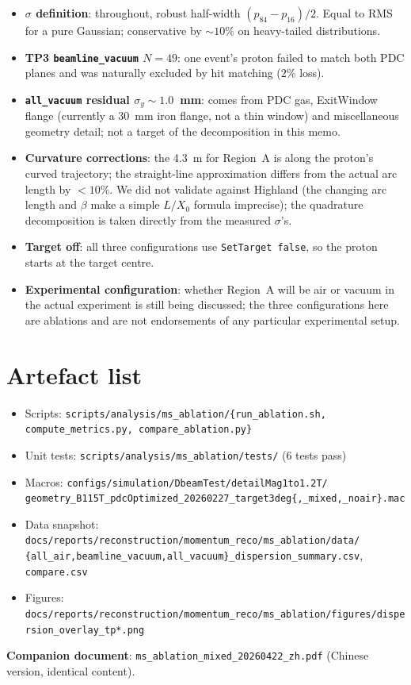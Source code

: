 \documentclass[a4paper, 11pt]{article}
\begin{document}
\begin{itemize}[nosep]
  \item \textbf{$\sigma$ definition}: throughout, robust half-width $(p_{84}-p_{16})/2$. Equal to RMS for a pure Gaussian; conservative by $\sim 10\%$ on heavy-tailed distributions.
  \item \textbf{TP3 \texttt{beamline\_vacuum} $N=49$}: one event's proton failed to match both PDC planes and was naturally excluded by hit matching ($2\%$ loss).
  \item \textbf{\texttt{all\_vacuum} residual $\sigma_y \sim 1.0$~mm}: comes from PDC gas, ExitWindow flange (currently a 30~mm iron flange, not a thin window) and miscellaneous geometry detail; not a target of the decomposition in this memo.
  \item \textbf{Curvature corrections}: the 4.3~m for Region~A is along the proton's curved trajectory; the straight-line approximation differs from the actual arc length by $< 10\%$. We did not validate against Highland (the changing arc length and $\beta$ make a simple $L/X_0$ formula imprecise); the quadrature decomposition is taken directly from the measured $\sigma$'s.
  \item \textbf{Target off}: all three configurations use \texttt{SetTarget false}, so the proton starts at the target centre.
  \item \textbf{Experimental configuration}: whether Region~A will be air or vacuum in the actual experiment is still being discussed; the three configurations here are ablations and are not endorsements of any particular experimental setup.
\end{itemize}

\section{Artefact list}

\begin{itemize}[nosep]
  \item Scripts: \verb|scripts/analysis/ms_ablation/{run_ablation.sh, compute_metrics.py, compare_ablation.py}|
  \item Unit tests: \verb|scripts/analysis/ms_ablation/tests/| (6 tests pass)
  \item Macros: \verb|configs/simulation/DbeamTest/detailMag1to1.2T/|\\
        \verb|geometry_B115T_pdcOptimized_20260227_target3deg{,_mixed,_noair}.mac|
  \item Data snapshot: \verb|docs/reports/reconstruction/momentum_reco/ms_ablation/data/|\\
        \verb|{all_air,beamline_vacuum,all_vacuum}_dispersion_summary.csv|, \verb|compare.csv|
  \item Figures: \verb|docs/reports/reconstruction/momentum_reco/ms_ablation/figures/dispersion_overlay_tp*.png|
\end{itemize}

\textbf{Companion document}: \texttt{ms\_ablation\_mixed\_20260422\_zh.pdf} (Chinese version, identical content).
\end{document}
